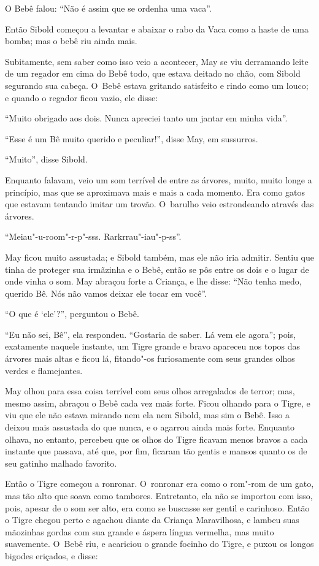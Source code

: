 O Bebê falou: ``Não é assim que se ordenha uma vaca''.

Então Sibold começou a levantar e abaixar o rabo da Vaca como a haste de
uma bomba; mas o bebê riu ainda mais.

Subitamente, sem saber como isso veio a acontecer, May se viu derramando
leite de um regador em cima do Bebê todo, que estava deitado no chão,
com Sibold segurando sua cabeça. O~Bebê estava gritando satisfeito e
rindo como um louco; e quando o regador ficou vazio, ele disse:

``Muito obrigado aos dois. Nunca apreciei tanto um jantar em minha
vida''.

``Esse é um Bê muito querido e peculiar!'', disse May, em sussurros.

``Muito'', disse Sibold.

Enquanto falavam, veio um som terrível de entre as árvores, muito, muito
longe a princípio, mas que se aproximava mais e mais a cada momento. Era
como gatos que estavam tentando imitar um trovão. O~barulho veio
estrondeando através das árvores.

``Meiau"-u-room"-r-p"-sss. Rarkrrau"-iau"-p-ss''.

May ficou muito assustada; e Sibold também, mas ele não iria admitir.
Sentiu que tinha de proteger sua irmãzinha e o Bebê, então se pôs entre
os dois e o lugar de onde vinha o som. May abraçou forte a Criança, e
lhe disse: ``Não tenha medo, querido Bê. Nós não vamos deixar ele tocar
em você''.

``O que é `ele'?'', perguntou o Bebê.

``Eu não sei, Bê'', ela respondeu. ``Gostaria de saber. Lá vem ele
agora''; pois, exatamente naquele instante, um Tigre grande e bravo
apareceu nos topos das árvores mais altas e ficou lá, fitando"-os
furiosamente com seus grandes olhos verdes e flamejantes.

May olhou para essa coisa terrível com seus olhos arregalados de terror;
mas, mesmo assim, abraçou o Bebê cada vez mais forte. Ficou olhando para
o Tigre, e viu que ele não estava mirando nem ela nem Sibold, mas sim o
Bebê. Isso a deixou mais assustada do que nunca, e o agarrou ainda
mais forte. Enquanto olhava, no entanto, percebeu que os olhos do Tigre
ficavam menos bravos a cada instante que passava, até que, por fim,
ficaram tão gentis e mansos quanto os de seu gatinho malhado favorito.

Então o Tigre começou a ronronar. O~ronronar era como o rom"-rom de um
gato, mas tão alto que soava como tambores. Entretanto, ela não se
importou com isso, pois, apesar de o som ser alto, era como se buscasse
ser gentil e carinhoso. Então o Tigre chegou perto e agachou diante da
Criança Maravilhosa, e lambeu suas mãozinhas gordas com sua grande e
áspera língua vermelha, mas muito suavemente. O~Bebê riu, e acariciou o
grande focinho do Tigre, e puxou os longos bigodes eriçados, e disse:

